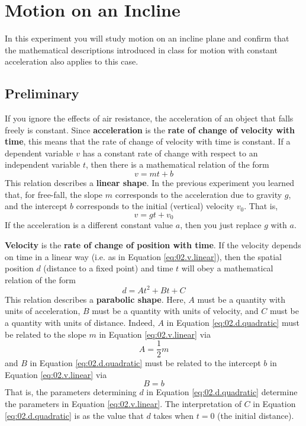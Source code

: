 \chapter{Motion on an Incline}
In this experiment you will study motion on an incline plane and confirm that the mathematical descriptions introduced in class for motion with constant acceleration also applies to this case.
\section{Preliminary}
If you ignore the effects of air resistance, the acceleration of an object that falls freely is constant. Since \textbf{acceleration} is the \textbf{rate of change of velocity with time}, this means that the rate of change of velocity with time is constant. If a dependent variable $v$ has a constant rate of change with respect to an independent variable $t$, then there is a mathematical relation of the form
\begin{equation}
    v = m t + b
    \label{eq:02.v.linear}
\end{equation}
This relation describes a \textbf{linear shape}. In the previous experiment you learned that, for free-fall, the slope $m$ corresponds to the acceleration due to gravity $g$, and the intercept $b$ corresponds to the initial (vertical) velocity $v_{0}$. That is,
\begin{equation}
    v = g t + v_{0}
\end{equation}
If the acceleration is a different constant value $a$, then you just replace $g$ with $a$.

\textbf{Velocity} is the \textbf{rate of change of position with time}. If the velocity depends on time in a linear way (i.e. as in Equation \ref{eq:02.v.linear}), then the spatial position $d$ (distance to a fixed point) and time $t$ will obey a mathematical relation of the form
\begin{equation}
    d = A t^{2} + B t + C
    \label{eq:02.d.quadratic}
\end{equation}
This relation describes a \textbf{parabolic shape}. Here, $A$ must be a quantity with units of acceleration, $B$ must be a quantity with units of velocity, and $C$ must be a quantity with units of distance. Indeed, $A$ in Equation \ref{eq:02.d.quadratic} must be related to the slope $m$ in Equation \ref{eq:02.v.linear} via
\begin{equation}
    A = \frac{1}{2} m
\end{equation}
and $B$ in Equation \ref{eq:02.d.quadratic} must be related to the intercept $b$ in Equation \ref{eq:02.v.linear} via
\begin{equation}
    B = b
\end{equation}
That is, the parameters determining $d$ in Equation \ref{eq:02.d.quadratic} determine the parameters in Equation \ref{eq:02.v.linear}. The interpretation of $C$ in Equation \ref{eq:02.d.quadratic} is as the value that $d$ takes when $t = 0$ (the initial distance).

